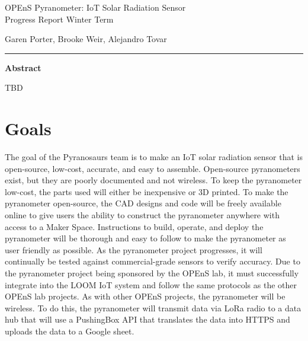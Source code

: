 \documentclass[10pt,draftclsnofoot,onecolumn,letterpaper]{article}
\begin{document}
\begin{Center}
{\fontsize{14pt}{16.8pt}\selectfont OPEnS Pyranometer: IoT Solar Radiation Sensor\\ Progress Report Winter Term\par}
\end{Center}\par
    
\begin{Center}
Garen Porter, Brooke Weir, Alejandro Tovar\\
\end{Center}\par
\hrule
\begin{Center}
{\fontsize{12pt}{16.8pt}\selectfont \textbf{Abstract}\par}
\end{Center}\par

TBD
    
{\fontsize{10pt}{12.0pt}\selectfont 
\par}\par
\newpage
{}
\tableofcontents
\clearpage
    
\section{Goals}
    The goal of the Pyranosaurs team is to make an IoT solar radiation sensor that is open-source, low-cost, accurate, and easy to assemble. Open-source pyranometers exist, but they are poorly documented and not wireless. To keep the pyranometer low-cost, the parts used will either be inexpensive or 3D printed. To make the pyranometer open-source, the CAD designs and code will be freely available online to give users the ability to construct the pyranometer anywhere with access to a Maker Space. Instructions to build, operate, and deploy the pyranometer will be thorough and easy to follow to make the pyranometer as user friendly as possible. As the pyranometer project progresses, it will continually be tested against commercial-grade sensors to verify accuracy. Due to the pyranometer project being sponsored by the OPEnS lab, it must successfully integrate into the LOOM IoT system and follow the same protocols as the other OPEnS lab projects. As with other OPEnS projects, the pyranometer will be wireless. To do this, the pyranometer will transmit data via LoRa radio to a data hub that will use a PushingBox API that translates the data into HTTPS and uploads the data to a Google sheet.
    
\end{document}
